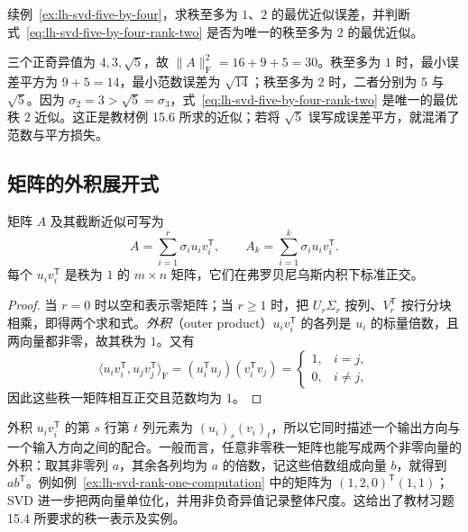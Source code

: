 \begin{example}
\label{ex:lh-svd-optimal-error}
续例~\ref{ex:lh-svd-five-by-four}，求秩至多为 $1$、$2$ 的最优近似误差，并判断式~\eqref{eq:lh-svd-five-by-four-rank-two} 是否为唯一的秩至多为 $2$ 的最优近似。
\end{example}
\begin{solve}
三个正奇异值为 $4,3,\sqrt5$，故 $\|A\|_{\mathrm F}^2=16+9+5=30$。秩至多为 $1$ 时，最小误差平方为 $9+5=14$，最小范数误差为 $\sqrt{14}$；秩至多为 $2$ 时，二者分别为 $5$ 与 $\sqrt5$。因为 $\sigma_2=3>\sqrt5=\sigma_3$，式~\eqref{eq:lh-svd-five-by-four-rank-two} 是唯一的最优秩 $2$ 近似。这正是教材例 15.6 所求的近似；若将 $\sqrt5$ 误写成误差平方，就混淆了范数与平方损失。
\end{solve}

\subsection{矩阵的外积展开式}
\label{subsec:lh-svd-outer-products}

\begin{proposition}[外积展开]
\label{prop:lh-svd-outer-product-expansion}
矩阵 $A$ 及其截断近似可写为
\begin{equation}
A=\sum_{i=1}^r\sigma_i u_iv_i^{\mathsf T},\qquad
A_k=\sum_{i=1}^k\sigma_i u_iv_i^{\mathsf T}.
\label{eq:lh-svd-outer-products}
\end{equation}
每个 $u_iv_i^{\mathsf T}$ 是秩为 $1$ 的 $m\times n$ 矩阵，它们在弗罗贝尼乌斯内积下标准正交。
\end{proposition}
\begin{proof}
当 $r=0$ 时以空和表示零矩阵；当 $r\geq1$ 时，把 $U_r\Sigma_r$ 按列、$V_r^{\mathsf T}$ 按行分块相乘，即得两个求和式。\emph{外积}（outer product）$u_iv_i^{\mathsf T}$ 的各列是 $u_i$ 的标量倍数，且两向量都非零，故其秩为 $1$。又有
\[
\langle u_iv_i^{\mathsf T},u_jv_j^{\mathsf T}\rangle_{\mathrm F}
=(u_i^{\mathsf T}u_j)(v_i^{\mathsf T}v_j)
=\begin{cases}1,&i=j,\\0,&i\ne j,\end{cases}
\]
因此这些秩一矩阵相互正交且范数均为 $1$。
\end{proof}

外积 $u_iv_i^{\mathsf T}$ 的第 $s$ 行第 $t$ 列元素为 $(u_i)_s(v_i)_t$，所以它同时描述一个输出方向与一个输入方向之间的配合。一般而言，任意非零秩一矩阵也能写成两个非零向量的外积：取其非零列 $a$，其余各列均为 $a$ 的倍数，记这些倍数组成向量 $b$，就得到 $ab^{\mathsf T}$。例如例~\ref{ex:lh-svd-rank-one-computation} 中的矩阵为 $(1,2,0)^{\mathsf T}(1,1)$；SVD 进一步把两向量单位化，并用非负奇异值记录整体尺度。这给出了教材习题 15.4 所要求的秩一表示及实例。


